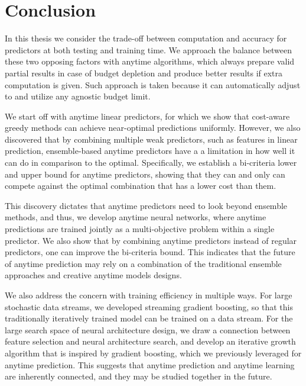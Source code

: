 \section{Conclusion}

In this thesis we consider the trade-off between computation and accuracy for predictors at 
both testing and training time. 
We approach the balance between these two opposing factors with anytime algorithms, which 
always prepare valid partial results in case of budget depletion and 
produce better results if extra computation is given. Such approach is taken because it
can automatically adjust to and utilize any agnostic budget limit. 

We start off with anytime linear predictors, for which we show that cost-aware greedy methods
can achieve near-optimal predictions uniformly. However, we also discovered that by combining 
multiple weak predictors, such as features in linear prediction, ensemble-based anytime predictors
have a a limitation in how well it can do in comparison to the optimal. Specifically, we establish
a bi-criteria lower and upper bound for anytime predictors, showing that they can and only can compete
against the optimal combination that has a lower cost than them.

This discovery dictates that anytime predictors need to look beyond ensemble methods, and thus,
we develop anytime neural networks, where anytime predictions are trained jointly as a multi-objective
problem within a single predictor. 
We also show that by combining anytime predictors instead of regular predictors, one can 
improve the bi-criteria bound. This indicates that the future of anytime prediction may
rely on a combination of the traditional ensemble approaches and creative anytime models designs.


We also address the concern with training efficiency in multiple ways. For large stochastic data streams,
we developed streaming gradient boosting, so that this traditionally iteratively trained model
can be trained on a data stream. For the large search space of neural architecture design, we 
draw a connection between feature selection and neural architecture search, and develop an iterative
growth algorithm that is inspired by gradient boosting, which we previously leveraged for anytime prediction. 
This suggests that anytime prediction and anytime learning are inherently connected, and they may be 
studied together in the future. 


